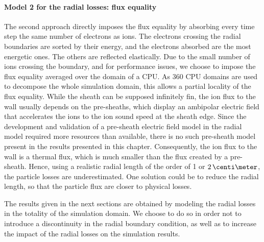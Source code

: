 \paragraph{Model 2 for the  radial losses\string: flux equality\\}
The second approach directly imposes the flux equality by absorbing every time step the same number of electrons as ions.
The electrons crossing the radial boundaries are sorted by their energy, and the electrons absorbed are the most energetic ones.
The others are reflected elastically.
Due to the small number of ions crossing the boundary, and for performance issues, we choose to impose the flux equality averaged over the domain of a CPU.
As 360 CPU domains are used to decompose the whole simulation domain, this allows a partial locality of the flux equality. 
\vspace{1ex}
While the sheath can be supposed infinitely fin, the ion flux to the wall usually depends on the pre-sheaths, which display an ambipolar electric field that accelerates the ions to the ion sound speed at the sheath edge.
Since the development and validation of a pre-sheath electric field model in the radial model required more resources than available, there is no such pre-sheath model present in the results presented in this chapter.
Consequently, the ion flux to the wall is a thermal flux, which is much smaller than the flux created by a pre-sheath.
Hence, using a realistic radial length  of the order of 1 or $2\,\centi\meter$, the particle losses are underestimated.
One solution could be to reduce the radial length, so that the particle flux are closer to physical losses.

The results given in the next sections are obtained by modeling the radial losses in the totality of the simulation domain.
We choose to do so in order not to introduce a discontinuity in the radial boundary condition, as well as to increase the impact of the radial losses on the simulation results.
